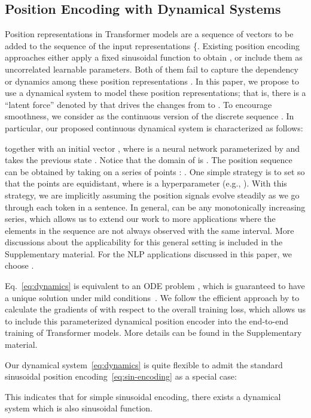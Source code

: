 \documentclass[11pt]{article}
\begin{document}
\subsection{Position Encoding with Dynamical Systems}
\label{sec:modeling}
Position representations in Transformer models are a sequence of 
vectors  to be added to the sequence 
of the input representations \{. 
Existing position encoding approaches either apply a fixed sinusoidal function to obtain , or include them as uncorrelated learnable parameters. 
Both of them fail to capture the dependency or dynamics among these position representations . 
In this paper, we propose to use a dynamical system to model these position representations; that is, 
there is a ``latent force'' denoted by  that drives the changes from  to .  
To encourage smoothness, we consider  as the continuous version of the 
discrete sequence . In particular, our proposed continuous dynamical system is characterized as follows:

together with an initial vector , where  is a neural network 
parameterized by  and takes the previous state . Notice that the domain of 
 is . The position sequence  can be obtained by taking  on a series of points : .
One simple strategy is to set  so that the points are equidistant, where  is a hyperparameter (e.g., ). 
With this strategy, we are implicitly assuming the position signals evolve steadily as we go through each token in a sentence. 
In general,  can be any monotonically increasing series, which allows us to extend our work to more applications where the elements in the sequence are not always observed with the same interval. More discussions about the applicability for this general setting is included in the Supplementary material. For the NLP applications discussed in this paper, we choose .
\par
Eq.~\eqref{eq:dynamics} is equivalent to an ODE problem , which is guaranteed to have a unique solution under mild conditions~\cite{clark1964ordinary}. We follow the efficient approach by \cite{chen2018neural} to calculate the gradients of  with respect to the overall training loss, which allows us to include this parameterized dynamical position encoder into the end-to-end training of Transformer models. More details can be found in the Supplementary material.
\par
Our dynamical system~\eqref{eq:dynamics} is quite flexible to admit the standard sinusoidal position encoding~\eqref{eq:sin-encoding} as a special case: 

This indicates that for simple sinusoidal encoding, there exists a dynamical system  which is also sinusoidal function.
\par
\end{document}
